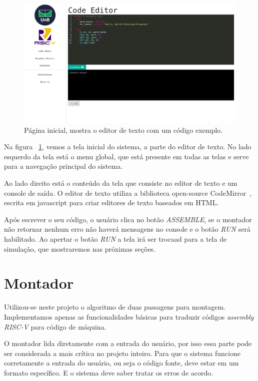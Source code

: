 	\begin{figure}[h]
	  \includegraphics[width=\linewidth]{img/code_editor.png}
	  \caption{Página inicial, mostra o editor de texto com um código exemplo.}
	  \label{fig:editor_texto}
	\end{figure}

	Na figura ~\ref{fig:editor_texto}, vemos a tela inicial do sistema, a parte do editor de texto. No lado esquerdo da tela está o menu global, que está presente em todas as telas e serve para a navegação principal do sistema.

	Ao lado direito está o conteúdo da tela que consiste no editor de texto e um console de saída. O editor de texto utiliza a biblioteca open-source CodeMirror~\cite{codemirror}, escrita em javascript para criar editores de texto baseados em HTML.

	Após escrever o seu código, o usuário clica no botão \textit{ASSEMBLE}, se o montador não retornar nenhum erro não haverá mensagens no console e o botão \textit{RUN} será habilitado. Ao apertar o botão \textit{RUN} a tela irá ser trocaad para a tela de simulação, que mostraremos nas próximas seções.

	
\section{Montador}
	
	Utilizou-se neste projeto o algoritmo de duas passagens para montagem. Implementamos apenas as funcionalidades básicas para traduzir códigos \textit{assembly RISC-V} para código de máquina.

	O montador lida diretamente com a entrada do usuário, por isso essa parte pode ser considerada a mais crítica no projeto inteiro. Para que o sistema funcione corretamente a entrada do usuário, ou seja o código fonte, deve estar em um formato específico. E o sistema deve saber tratar os erros de acordo. 

